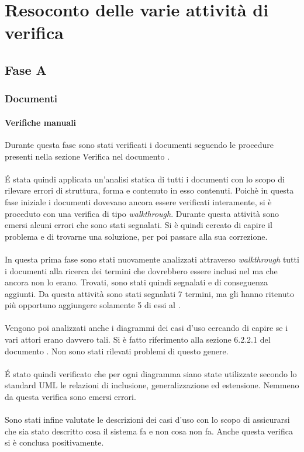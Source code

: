 \section{Resoconto delle varie attività di verifica}
		\subsection{Fase A}
			\subsubsection{Documenti}
				\paragraph{Verifiche manuali}
					Durante questa fase sono stati verificati i documenti seguendo le procedure presenti nella sezione Verifica nel documento .\\\\
					É stata quindi applicata un'analisi  statica di tutti i documenti con lo scopo di rilevare errori di struttura, forma e contenuto in esso contenuti. Poichè in questa fase iniziale i documenti dovevano ancora essere verificati interamente, si è proceduto con una verifica di tipo \textit{walkthrough}. Durante questa attività sono emersi alcuni errori che sono stati segnalati. Si è quindi cercato di capire il problema e di trovarne una soluzione, per poi passare alla sua correzione.\\ \\%
					In questa prima fase sono stati nuovamente analizzati attraverso \textit{walkthrough} tutti i documenti alla ricerca dei termini che dovrebbero essere inclusi nel  ma che ancora non lo erano. Trovati, sono stati quindi segnalati e di conseguenza aggiunti. Da questa attività sono stati segnalati 7 termini, ma gli  hanno ritenuto più opportuno aggiungere solamente 5 di essi al  .\\\\
					Vengono poi analizzati anche i diagrammi dei casi d'uso cercando di capire se i vari attori erano davvero tali. Si è fatto riferimento alla sezione 6.2.2.1 del documento . Non sono stati rilevati problemi di questo genere.\\\\
					É stato quindi verificato che per ogni diagramma siano state utilizzate secondo lo standard UML le relazioni di inclusione, generalizzazione ed estensione. Nemmeno da questa verifica sono emersi errori.\\\\
					Sono stati infine valutate le descrizioni dei casi d'uso con lo scopo di assicurarsi che sia stato descritto cosa il sistema fa e non cosa non fa. Anche questa verifica si è conclusa positivamente.
